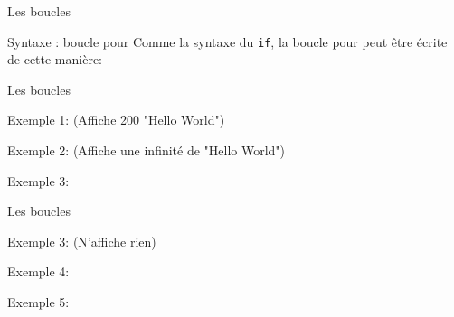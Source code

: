 	\begin{frame}{Les boucles}
		\begin{block}{Syntaxe : boucle pour}
			Comme la syntaxe du \texttt{if}, la boucle pour peut être écrite de cette manière:
			\forsyntaxtwo
		\end{block}
		\begin{center}
			\begin{minipage}[t]{0.48\linewidth}
				\forExmpOne
			\end{minipage}
			\begin{minipage}[t]{0.48\linewidth}
				\forExmpTwo
			\end{minipage}
		\end{center}
	\end{frame}
	



	
	\begin{frame}{Les boucles}
		\begin{center}
			\begin{minipage}[t]{0.8\linewidth}
				Exemple 1: (\alert{Affiche 200 "Hello World"})
				\forExmpOne
			\end{minipage}
			\begin{minipage}[t]{0.8\linewidth}
				Exemple 2: (\alert{Affiche une infinité de "Hello World"})
				\forExmpTwo
			\end{minipage}
			\begin{minipage}[t]{0.8\linewidth}
				Exemple 3:
				\forExmpThree
			\end{minipage}
		\end{center}
	\end{frame}
	
	\begin{frame}{Les boucles}	
		\begin{minipage}[t]{0.8\linewidth}
			Exemple 3: (\alert{N'affiche rien})
			\forExmpThree
		\end{minipage}
		\begin{minipage}[t]{0.8\linewidth}
			Exemple 4:
			\forExmpFour
		\end{minipage}
		\begin{minipage}[t]{0.8\linewidth}
			Exemple 5:
			\forExmpFive
		\end{minipage}
	\end{frame}

